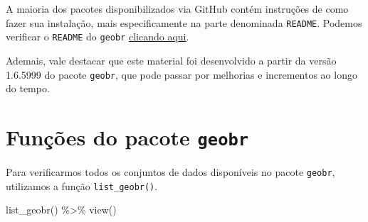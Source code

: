 \documentclass[
  brazilian,
]{book}
\newenvironment{Shaded}{\begin{snugshade}}{\end{snugshade}}
\newcommand{\FunctionTok}[1]{\textcolor[rgb]{0.00,0.00,0.00}{#1}}
\newcommand{\NormalTok}[1]{#1}
\newcommand{\SpecialCharTok}[1]{\textcolor[rgb]{0.00,0.00,0.00}{#1}}
\begin{document}
A maioria dos pacotes disponibilizados via GitHub contém instruções de como fazer sua instalação, mais especificamente na parte denominada \texttt{README}. Podemos verificar o \texttt{README} do \texttt{geobr} \href{https://github.com/ipeaGIT/geobr\#readme}{clicando aqui}.

Ademais, vale destacar que este material foi desenvolvido a partir da versão 1.6.5999 do pacote \texttt{geobr}, que pode passar por melhorias e incrementos ao longo do tempo.

\hypertarget{funuxe7uxf5es-do-pacote-geobr}{%
\section{\texorpdfstring{Funções do pacote \texttt{geobr}}{Funções do pacote geobr}}\label{funuxe7uxf5es-do-pacote-geobr}}

Para verificarmos todos os conjuntos de dados disponíveis no pacote \texttt{geobr}, utilizamos a função \texttt{list\_geobr()}.

\begin{Shaded}
\begin{Highlighting}[]
\FunctionTok{list\_geobr}\NormalTok{() }\SpecialCharTok{\%\textgreater{}\%} \FunctionTok{view}\NormalTok{()}
\end{Highlighting}
\end{Shaded}
\end{document}

